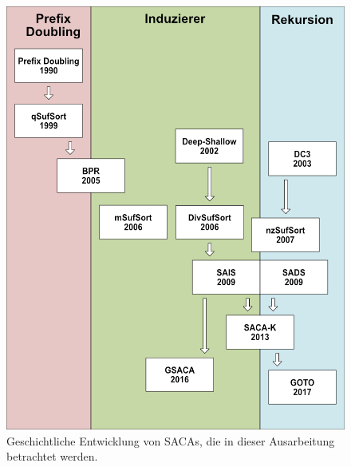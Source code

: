 \begin{figure}[H]
	\centering
	\includegraphics[width=\linewidth]{kapitel/5_saca_uebersicht/history/history2}
	\caption{Geschichtliche Entwicklung von SACAs, die in dieser Ausarbeitung betrachtet werden.}
	\label{fig_banane_1_2}
\end{figure}

